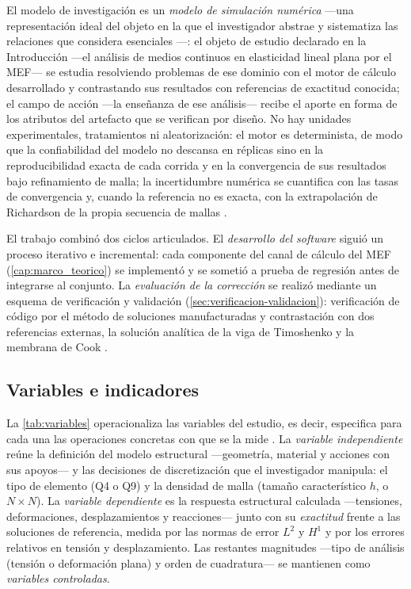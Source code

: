 El modelo de investigación es un \emph{modelo de simulación numérica} —una representación ideal del objeto en la que el investigador abstrae y sistematiza las relaciones que considera esenciales \autocite[p.~21]{alvarez_metodologia}—: el objeto de estudio declarado en la Introducción —el análisis de medios continuos en elasticidad lineal plana por el MEF— se estudia resolviendo problemas de ese dominio con el motor de cálculo desarrollado y contrastando sus resultados con referencias de exactitud conocida; el campo de acción —la enseñanza de ese análisis— recibe el aporte en forma de los atributos del artefacto que se verifican por diseño. No hay unidades experimentales, tratamientos ni aleatorización: el motor es determinista, de modo que la confiabilidad del modelo no descansa en réplicas sino en la reproducibilidad exacta de cada corrida y en la convergencia de sus resultados bajo refinamiento de malla; la incertidumbre numérica se cuantifica con las tasas de convergencia y, cuando la referencia no es exacta, con la extrapolación de Richardson de la propia secuencia de mallas \autocite[pp.~309-312]{oberkampf2010vv}.

El trabajo combinó dos ciclos articulados. El \emph{desarrollo del software} siguió un proceso iterativo e incremental: cada componente del canal de cálculo del MEF (\autoref{cap:marco_teorico}) se implementó y se sometió a prueba de regresión antes de integrarse al conjunto. La \emph{evaluación de la corrección} se realizó mediante un esquema de verificación y validación (\autoref{sec:verificacion-validacion}): verificación de código por el método de soluciones manufacturadas y contrastación con dos referencias externas, la solución analítica de la viga de Timoshenko y la membrana de Cook \autocite{oberkampf2010vv,salari2000mms}.

\subsection{Variables e indicadores}
\label{sec:variables-met}

La \autoref{tab:variables} operacionaliza las variables del estudio, es decir, especifica para cada una las operaciones concretas con que se la mide \autocite[p.~137]{sampieri2018metodologia}. La \emph{variable independiente} reúne la definición del modelo estructural —geometría, material y acciones con sus apoyos— y las decisiones de discretización que el investigador manipula: el tipo de elemento (Q4 o Q9) y la densidad de malla (tamaño característico $h$, o $N\times N$). La \emph{variable dependiente} es la respuesta estructural calculada —tensiones, deformaciones, desplazamientos y reacciones— junto con su \emph{exactitud} frente a las soluciones de referencia, medida por las normas de error $L^2$ y $H^1$ y por los errores relativos en tensión y desplazamiento. Las restantes magnitudes —tipo de análisis (tensión o deformación plana) y orden de cuadratura— se mantienen como \emph{variables controladas}.

